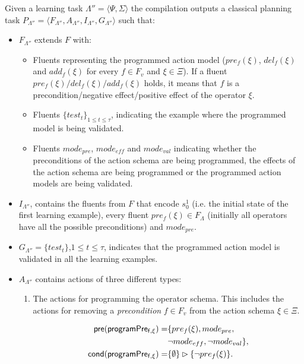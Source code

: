 \documentclass[letterpaper]{article} %
\newcommand{\tup}[1]{{\langle #1 \rangle}}
\newcommand{\pre}{\mathsf{pre}}     %
\newcommand{\cond}{\mathsf{cond}}   %
\begin{document}
Given a learning task $\Lambda''=\tup{\Psi,\Sigma}$ the compilation outputs a classical planning task $P_{\Lambda''}=\tup{F_{\Lambda''},A_{\Lambda''},I_{\Lambda''},G_{\Lambda''}}$ such that:
\begin{itemize}
\item $F_{\Lambda''}$ extends $F$ with:
\begin{itemize}
\item Fluents representing the programmed action model ($pre_f(\xi)$, $del_f(\xi)$ and $add_f(\xi)$ for every $f\in F_v$ and $\xi \in \Xi$). If a fluent $pre_f(\xi)/del_f(\xi)/add_f(\xi)$ holds, it means that $f$ is a precondition/negative effect/positive effect of the operator $\xi$. 
\item Fluents $\{test_t\}_{1\leq t\leq \tau}$, indicating the example where the programmed model is being validated.
\item Fluents $mode_{pre}$, $mode_{eff}$ and $mode_{val}$ indicating whether the preconditions of the action schema are being programmed, the effects of the action schema are being programmed or the programmed action models are being validated.
\end{itemize}
\item $I_{\Lambda''}$, contains the fluents from $F$ that encode $s_0^1$ (i.e. the initial state of the first learning example), every fluent $pre_f(\xi)\in F_{\Lambda}$ (initially all operators have all the possible preconditions) and $mode_{pre}$. 
\item $G_{\Lambda''}=\{test_t\}$,{\small $1\leq t\leq \tau$}, indicates that the programmed action model is validated in all the learning examples.
\item $A_{\Lambda''}$ contains actions of three different types:
\begin{enumerate}
\item The actions for programming the operator schema. This includes the actions for removing a {\em precondition} $f\in F_v$ from the action schema $\xi\in\Xi$.

\begin{small}
\begin{align*}
\hspace*{7pt}\pre(\mathsf{programPre_{f,\xi}})=&\{pre_{f}(\xi),mode_{pre}, \\
&\neg mode_{eff}, \neg mode_{val}\},\\    
\cond(\mathsf{programPre_{f,\xi}})=&\{\emptyset\}\rhd\{\neg pre_{f}(\xi)\}.
\end{align*}
\end{small}


\end{enumerate}
\end{itemize}
\end{document}

